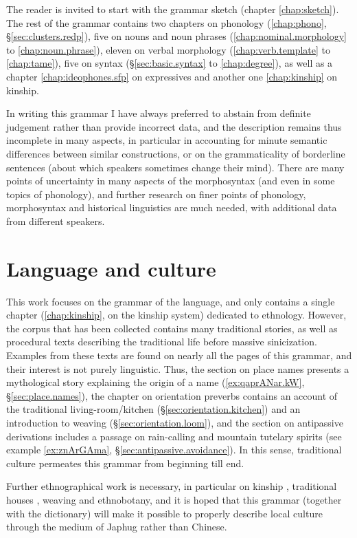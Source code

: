 The reader is invited to start with the grammar sketch (chapter \ref{chap:sketch}). The rest of the grammar contains two chapters on phonology (\ref{chap:phono}, §\ref{sec:clusters.redp}), five on nouns and noun phrases (\ref{chap:nominal.morphology} to \ref{chap:noun.phrase}), eleven on verbal morphology (\ref{chap:verb.template} to \ref{chap:tame}), five on syntax (§\ref{sec:basic.syntax} to \ref{chap:degree}), as well as a chapter \ref{chap:ideophones.sfp} on expressives and another one \ref{chap:kinship} on kinship.

In writing this grammar I have always preferred to abstain from definite judgement rather than provide incorrect data, and the description remains thus incomplete in many aspects, in particular in accounting for minute semantic differences between similar constructions, or on the grammaticality of borderline sentences (about which speakers sometimes change their mind). There are many points of uncertainty in many aspects of the morphosyntax (and even in some topics of phonology), and further research on finer points of phonology, morphosyntax and historical linguistics are much needed, with additional data from different speakers.

\section{Language and culture}
This work focuses on the grammar of the language, and only contains a single chapter (\ref{chap:kinship}, on the kinship system) dedicated to ethnology. However, the corpus that has been collected contains many traditional stories, as well as procedural texts describing the traditional life before massive sinicization. Examples from these texts are found on nearly all the pages of this grammar, and their interest is not purely linguistic. Thus, the section on place names presents a mythological story explaining the origin of a name (\ref{ex:qaprANar.kW}, §\ref{sec:place.names}), the chapter on orientation preverbs contains an account of the traditional living-room/kitchen (§\ref{sec:orientation.kitchen}) and an introduction to weaving (§\ref{sec:orientation.loom}), and the section on antipassive derivations includes a passage on rain-calling and mountain tutelary spirits  (see example \ref{ex:znArGAma}, §\ref{sec:antipassive.avoidance}). In this sense, traditional culture permeates this grammar from beginning till end.

Further ethnographical work is necessary, in particular on kinship \citep{zhangsy20kinship}, traditional houses \citep{dongsy18chabao}, weaving and ethnobotany, and it is hoped that this grammar (together with the dictionary) will make it possible to properly describe local culture through the medium of Japhug rather than Chinese.

